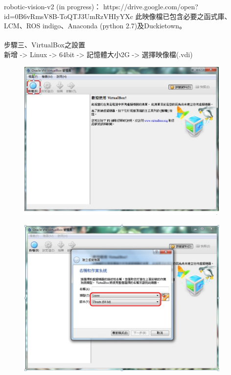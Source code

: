 \documentclass{article}
\begin{document}
robotic-vision-v2 (in progress)：
https://drive.google.com/open?id=0B6vRmsV8B-ToQTJ3UmRzVHIyYXc
此映像檔已包含必要之函式庫、LCM、ROS indigo、Anaconda (python 2.7)及Duckietown。
\\
\\步驟三、VirtualBox之設置
\\新增 -> Linux -> 64bit -> 記憶體大小2G -> 選擇映像檔(.vdi)
\begin{figure}[htp]
    \begin{center}
        \includegraphics[width=300pt]{pic/圖片2.jpg}
    \end{center}
\end{figure}

\begin{figure}[htp]
    \begin{center}
        \includegraphics[width=300pt]{pic/圖片3.jpg}
    \end{center}
\end{figure}
\end{document}
